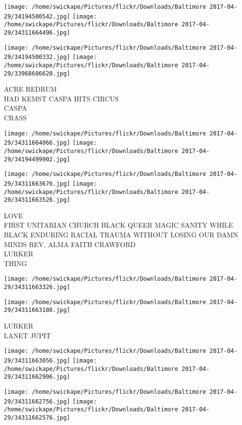 \documentclass[10pt,letterpaper]{article}
\begin{document}
\texttt{[image: /home/swickape/Pictures/flickr/Downloads/Baltimore 2017-04-29/34194500542.jpg]}
\texttt{[image: /home/swickape/Pictures/flickr/Downloads/Baltimore 2017-04-29/34311664496.jpg]}

\texttt{[image: /home/swickape/Pictures/flickr/Downloads/Baltimore 2017-04-29/34194500332.jpg]}
\texttt{[image: /home/swickape/Pictures/flickr/Downloads/Baltimore 2017-04-29/33968686620.jpg]}

ACRE REDRUM\\
HAD KEMST CASPA HITS CIRCUS\\
CASPA\\
CRASS\\
\pagebreak

\texttt{[image: /home/swickape/Pictures/flickr/Downloads/Baltimore 2017-04-29/34311664066.jpg]}
\texttt{[image: /home/swickape/Pictures/flickr/Downloads/Baltimore 2017-04-29/34194499902.jpg]}

\texttt{[image: /home/swickape/Pictures/flickr/Downloads/Baltimore 2017-04-29/34311663676.jpg]}
\texttt{[image: /home/swickape/Pictures/flickr/Downloads/Baltimore 2017-04-29/34311663526.jpg]}

LOVE\\
FIRST UNITARIAN CHURCH BLACK QUEER MAGIC SANITY WHILE BLACK ENDURING RACIAL TRAUMA WITHOUT LOSING OUR DAMN MINDS REV. ALMA FAITH CRAWFORD\\
LURKER\\
THING\\
\pagebreak

\texttt{[image: /home/swickape/Pictures/flickr/Downloads/Baltimore 2017-04-29/34311663326.jpg]}

\vspace{0.25in}
\texttt{[image: /home/swickape/Pictures/flickr/Downloads/Baltimore 2017-04-29/34311663186.jpg]}

LURKER\\
LANET JUPIT\\
\pagebreak

\texttt{[image: /home/swickape/Pictures/flickr/Downloads/Baltimore 2017-04-29/34311663056.jpg]}
\texttt{[image: /home/swickape/Pictures/flickr/Downloads/Baltimore 2017-04-29/34311662906.jpg]}

\texttt{[image: /home/swickape/Pictures/flickr/Downloads/Baltimore 2017-04-29/34311662756.jpg]}
\texttt{[image: /home/swickape/Pictures/flickr/Downloads/Baltimore 2017-04-29/34311662576.jpg]}
\end{document}
